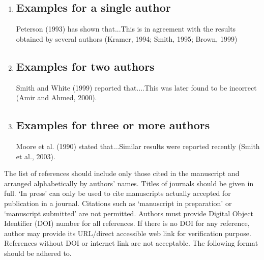 \documentclass[fleqn,10pt]{thescipub} %
\begin{document}
\begin{enumerate}
\item \subsection{Examples for a single author}
Peterson (1993) has shown that...This is in agreement with the results obtained by several authors (Kramer, 1994; Smith, 1995; Brown, 1999)
\item \subsection{Examples for two authors}
Smith and White (1999) reported that....This was later found to be incorrect (Amir and Ahmed, 2000).

\item \subsection{Examples for three or more authors}
Moore et al. (1990) stated that...Similar results were reported recently (Smith et al., 2003).
\end{enumerate}

The list of references should include only those cited in the manuscript and arranged alphabetically by authors’ names. Titles of journals should be given in full. ‘In press' can only be used to cite manuscripts actually accepted for publication in a journal. Citations such as ‘manuscript in preparation' or ‘manuscript submitted' are not permitted. Authors must provide Digital Object Identifier (DOI) number for all references. If there is no DOI for any reference, author may provide its URL/direct accessible web link for verification purpose. References without DOI or internet link are not acceptable.  The following format should be adhered to.
\end{document}
